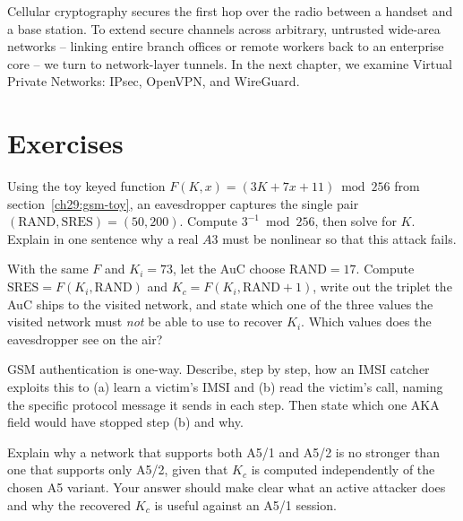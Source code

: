 Cellular cryptography secures the first hop over the radio between a handset and a base station. To extend secure channels across arbitrary, untrusted wide-area networks -- linking entire branch offices or remote workers back to an enterprise core -- we turn to network-layer tunnels. In the next chapter, we examine Virtual Private Networks: IPsec, OpenVPN, and WireGuard.

\section{Exercises}
\label{ch29:exercises}

\begin{exercise}
Using the toy keyed function $F(K,x) = (3K + 7x + 11)\bmod 256$ from section~\ref{ch29:gsm-toy}, an eavesdropper captures the single pair $(\text{RAND},\text{SRES}) = (50, 200)$. Compute $3^{-1} \bmod 256$, then solve for $K$. Explain in one sentence why a real $A3$ must be nonlinear so that this attack fails.
\end{exercise}

\begin{exercise}
With the same $F$ and $K_i = 73$, let the AuC choose $\text{RAND}=17$. Compute $\text{SRES}=F(K_i,\text{RAND})$ and $K_c=F(K_i,\text{RAND}+1)$, write out the triplet the AuC ships to the visited network, and state which one of the three values the visited network must \emph{not} be able to use to recover $K_i$. Which values does the eavesdropper see on the air?
\end{exercise}

\begin{exercise}
GSM authentication is one-way. Describe, step by step, how an IMSI catcher exploits this to (a) learn a victim's IMSI and (b) read the victim's call, naming the specific protocol message it sends in each step. Then state which one AKA field would have stopped step (b) and why.
\end{exercise}

\begin{exercise}
Explain why a network that supports both A5/1 and A5/2 is no stronger than one that supports only A5/2, given that $K_c$ is computed independently of the chosen A5 variant. Your answer should make clear what an active attacker does and why the recovered $K_c$ is useful against an A5/1 session.
\end{exercise}

